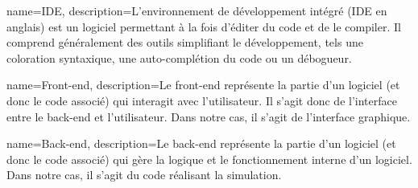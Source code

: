 {
	name=IDE,
	description={L'environnement de développement intégré (IDE en anglais) est un logiciel permettant à la fois d'éditer du code et de le compiler. Il comprend généralement des outils simplifiant le développement, tels une coloration syntaxique, une auto-complétion du code ou un débogueur.}
}

{
	name=Front-end,
	description={Le front-end représente la partie d'un logiciel (et donc le code associé) qui interagit avec l'utilisateur. Il s'agit donc de l'interface entre le back-end et l'utilisateur. Dans notre cas, il s'agit de l'interface graphique.}
}

{
	name=Back-end,
	description={Le back-end représente la partie d'un logiciel (et donc le code associé) qui gère la logique et le fonctionnement interne d'un logiciel. Dans notre cas, il s'agit du code réalisant la simulation.}
}

